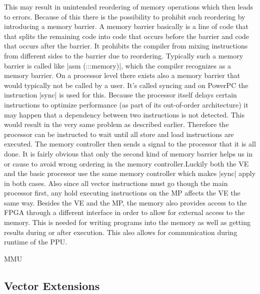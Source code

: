 This may result in unintended reordering of memory operations which then leads to errors.
Because of this there is the possibility to prohibit such reordering by introducing a memory barrier.
A memory barrier basically is a line of code that that splits the remaining code into code that occurs before the barrier and code that occurs after the barrier.
It prohibits the compiler from mixing instructions from different sides to the barrier due to reordering.
Typically such a memory barrier is called like |asm (:::memory)|, which the compiler recognizes as a memory barrier.
On a processor level there exists also a memory barrier that would typically not be called by a user.
It's called syncing and on PowerPC the instruction |sync| is used for this.
Because the processor itself delays certain instructions to optimize performance (as part of its out-of-order architecture) it may happen that a dependency between two instructions is not detected.
This would result in the very same problem as described earlier.
Therefore the processor can be instructed to wait until all store and load instructions are executed.
The memory controller then sends a signal to the processor that it is all done.
It is fairly obvious that only the second kind of memory barrier helps us in or cause to avoid wrong ordering in the memory controller.Luckily both the VE and the basic processor use the same memory controller which makes |sync| apply in both cases.
Also since all vector instructions must go though the main processor first, any hold executing instructions on the MP affects the VE the same way.
Besides the VE and the MP, the memory also provides access to the FPGA through a different interface  in order to allow for external access to the memory.
This is needed for writing programs into the memory as well as getting results during or after execution.
This also allows for communication during runtime of the PPU.

MMU

\subsection{Vector Extensions}

